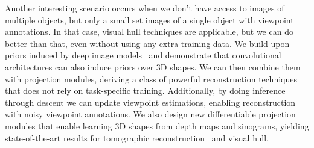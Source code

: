 Another interesting scenario occurs when we don't have access to images of multiple objects,
but only a small set images of a single object with viewpoint annotations.
In that case, visual hull techniques are applicable, but we can do better than that, even without
using any extra training data.
We build upon priors induced by deep image models~\cite{bayesiandip} and
demonstrate that convolutional architectures can also induce priors over 3D shapes.
We can then combine them with projection modules, deriving a class of powerful reconstruction techniques that
does not rely on task-specific training.
Additionally, by doing inference through descent we can update viewpoint estimations, enabling reconstruction with noisy viewpoint annotations.
We also design new differentiable projection modules that enable learning 3D shapes from depth maps and sinograms,
yielding state-of-the-art results for tomographic reconstruction~\cite{gadelha19deepshape} and visual hull.